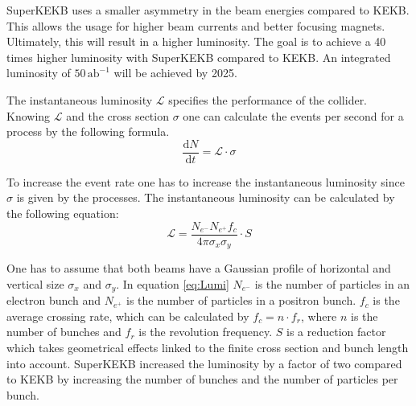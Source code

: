 \documentclass[a4paper,11pt,twosided,final,german,openbib,pdftex,listof=totoc,bibliography=totoc]{scrbook}
\begin{document}
SuperKEKB uses a smaller asymmetry in the beam energies compared to KEKB. This allows the usage for higher beam currents and better focusing magnets. Ultimately, this will result in a higher luminosity. The goal is to achieve a 40 times higher luminosity with SuperKEKB compared to KEKB.
An integrated luminosity of $50\,\textrm{ab}^{-1}$ will be achieved by 2025.\cite{B2B}

The instantaneous luminosity $\mathcal{L}$ specifies the performance of the collider. Knowing $\mathcal{L} $ and the cross section $\sigma$ one can calculate the events per second for a process by the following formula.
\begin{equation}
\frac{\textrm{d}N}{\textrm{d}t} = \mathcal{L} \cdot \sigma
\end{equation} 

To increase the event rate one has to increase the instantaneous luminosity since $\sigma$ is given by the processes. The instantaneous luminosity can be calculated by the following equation:
\begin{equation}
	\mathcal{L} = \frac{N_{e^-}N_{e^+}f_c}{4\pi \sigma_x \sigma_y} \cdot S
	\label{eq:Lumi}
\end{equation}

One has to assume that both beams have a Gaussian profile of horizontal and vertical size $\sigma_x$ and $\sigma_y$. In equation \ref{eq:Lumi} $N_{e^-}$ is the number of particles in an electron bunch and $N_{e^+}$ is the number of particles in a positron bunch. $f_c$ is the average crossing rate, which can be calculated by $f_c = n \cdot f_r$, where $n$ is the number of bunches and $f_r$ is the revolution frequency. $S$ is a reduction factor which takes geometrical effects linked to the finite cross section and bunch length into account.\cite{herr2006concept} 
SuperKEKB increased the luminosity by a factor of two compared to KEKB by increasing the number of bunches and the number of particles per bunch.
 
\end{document}
